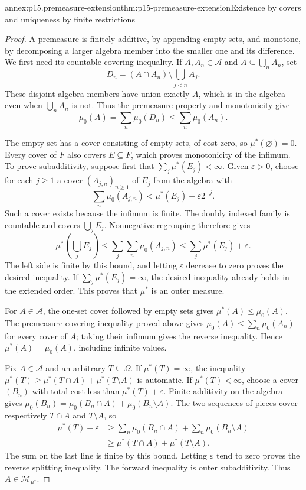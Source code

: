 \begin{annexitem}{annex:p15.premeasure-extension}{thm:p15-premeasure-extension}{Existence by covers and uniqueness by finite restrictions}
\begin{proof}
A premeasure is finitely additive, by appending empty sets, and monotone,
by decomposing a larger algebra member into the smaller one and its
difference. We first need its countable covering inequality. If
\(A,A_n\in\mathcal A\) and \(A\subseteq\bigcup_n A_n\), set
\[
 D_n=(A\cap A_n)\setminus\bigcup_{j<n}A_j.
\]
These disjoint algebra members have union exactly \(A\), which is
in the algebra even when \(\bigcup_n A_n\) is not. Thus the
premeasure property and monotonicity give
\[
 \mu_0(A)=\sum_n\mu_0(D_n)\leq\sum_n\mu_0(A_n).
\]

The empty set has a cover consisting of empty sets, of cost zero, so
\(\mu^*(\varnothing)=0\). Every cover of \(F\) also covers
\(E\subseteq F\), which proves monotonicity of the infimum.
To prove subadditivity, suppose first that
\(\sum_j\mu^*(E_j)<\infty\). Given \(\varepsilon>0\), choose
for each \(j\geq1\) a cover \((A_{j,n})_{n\geq1}\) of \(E_j\)
from the algebra with
\[
 \sum_n\mu_0(A_{j,n})<\mu^*(E_j)+\varepsilon2^{-j}.
\]
Such a cover exists because the infimum is finite. The doubly indexed
family is countable and covers \(\bigcup_j E_j\). Nonnegative
regrouping therefore gives
\[
 \mu^*\left(\bigcup_j E_j\right)
   \leq\sum_j\sum_n\mu_0(A_{j,n})
   \leq\sum_j\mu^*(E_j)+\varepsilon.
\]
The left side is finite by this bound, and letting \(\varepsilon\)
decrease to zero proves the desired inequality. If
\(\sum_j\mu^*(E_j)=\infty\), the desired inequality already holds
in the extended order. This proves that \(\mu^*\) is an outer measure.

For \(A\in\mathcal A\), the one-set cover followed by empty sets
gives \(\mu^*(A)\leq\mu_0(A)\). The premeasure covering inequality
proved above gives \(\mu_0(A)\leq\sum_n\mu_0(A_n)\) for every
cover of \(A\); taking their infimum gives the reverse inequality.
Hence \(\mu^*(A)=\mu_0(A)\), including infinite values.

Fix \(A\in\mathcal A\) and an arbitrary \(T\subseteq\Omega\).
If \(\mu^*(T)=\infty\), the inequality
\(\mu^*(T)\geq\mu^*(T\cap A)+\mu^*(T\setminus A)\) is automatic.
If \(\mu^*(T)<\infty\), choose a cover \((B_n)\) with total
cost less than \(\mu^*(T)+\varepsilon\). Finite additivity on
the algebra gives
\(\mu_0(B_n)=\mu_0(B_n\cap A)+\mu_0(B_n\setminus A)\).
The two sequences of pieces cover respectively \(T\cap A\) and
\(T\setminus A\), so
\[
 \begin{aligned}
 \mu^*(T)+\varepsilon
   &\geq\sum_n\mu_0(B_n\cap A)+\sum_n\mu_0(B_n\setminus A)\\
   &\geq\mu^*(T\cap A)+\mu^*(T\setminus A).
 \end{aligned}
\]
The sum on the last line is finite by this bound. Letting
\(\varepsilon\) tend to zero proves the reverse splitting inequality.
The forward inequality is outer subadditivity. Thus
\(A\in\mathcal M_{\mu^*}\).


\end{proof}
\end{annexitem}
